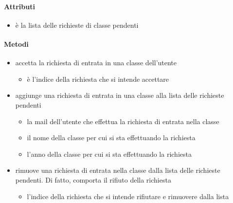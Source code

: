 \paragraph{Attributi}
\begin{itemize}
\item {}
\newline
è la lista delle richieste di classe pendenti
\end{itemize}
\paragraph{Metodi}
\begin{itemize}
\item {}
\newline
accetta la richiesta di entrata in una classe dell'utente
\newline
{}
\newline
\begin{itemize}
\item {}
\newline
è l'indice della richiesta che si intende accettare
\end{itemize}
\item {}
\newline
aggiunge una richiesta di entrata in una classe alla lista delle richieste pendenti
\newline
{}
\newline
\begin{itemize}
\item {}
\newline
la mail dell'utente che effettua la richiesta di entrata nella classe
\item {}
\newline
il nome della classe per cui si sta effettuando la richiesta
\item {}
\newline
l'anno della classe per cui si sta effettuando la richiesta
\end{itemize}
\item {}
\newline
rimuove una richiesta di entrata nella classe dalla lista delle richieste pendenti. Di fatto, comporta il rifiuto della richiesta
\newline
{}
\newline
\begin{itemize}
\item {}
\newline
l'indice della richiesta che si intende rifiutare e rimuovere dalla lista
\end{itemize}
\end{itemize}
